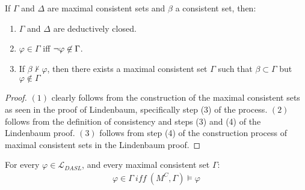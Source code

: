 \begin{lemma}[Properties]

If $\Gamma$ and $\Delta$ are maximal consistent sets and $\beta$ a consistent set, then:
\begin{enumerate}
	\item $\Gamma$ and $\Delta$ are deductively closed.
	\item $\varphi \in \Gamma$ iff ${\neg} \varphi \not\in \Gamma$.
    \item If $\beta \not \vdash \varphi$, then there exists a maximal consistent set $\Gamma$ such that $\beta \subset \Gamma$ but $\varphi \not \in \Gamma$
\end{enumerate}
\end{lemma}
\begin{proof}
	$(1)$ clearly follows from the construction of the maximal consistent sets as seen in the proof of Lindenbaum, specifically step (3) of the process. $(2)$ follows from the definition of consistency and steps (3) and (4) of the Lindenbaum proof. $(3)$ follows from step (4) of the construction process of maximal consistent sets in the Lindenbaum proof.  
\end{proof}
\begin{lemma}[Truth]
For every $\varphi \in \mathcal{L}_{DASL}$, and every maximal consistent set $\Gamma$:
\begin{eqnarray*}
	\varphi \in \Gamma \ \mathit{iff}\ (M^C,\Gamma)\models\varphi
\end{eqnarray*}
\end{lemma}
